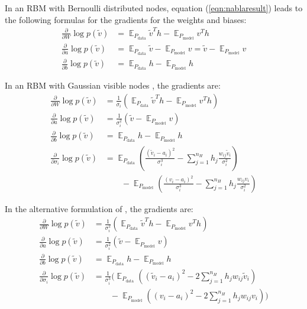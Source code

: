 \documentclass[12pt]{article}
\DeclareMathOperator{\EX}{\mathbb{E}}
\begin{document}
In an RBM with Bernoulli distributed nodes, equation (\ref{eqn:nablaresult}) leads to the following formulas for the gradients for the weights and biases:
\begin{align*}
\frac{\partial}{\partial W}  \log p(\widetilde{v}) &= \EX_{P_\text{data}}  \widetilde{v}^T h - \EX_{P_\text{model}} v^T h \\
\frac{\partial}{\partial a}  \log p(\widetilde{v}) &=  \EX_{P_\text{data}}
\widetilde{v} - \EX_{P_\text{model}}  v = \widetilde{v} - \EX_{P_\text{model}} v\\
\frac{\partial}{\partial b}  \log p(\widetilde{v}) &=  \EX_{P_\text{data}} h - \EX_{P_\text{model}} h
\end{align*}

In an RBM with Gaussian visible nodes \citep{krizhevsky2009tinyimagesthesis}, the  gradients are:
\begin{align*}
\frac{\partial}{\partial W} \log p(\widetilde{v}) &= \frac{1}{\sigma_i} \left ( \EX_{P_\text{data}} \widetilde{v}^T h - \EX_{P_\text{model}} v^T h \right) \\
\frac{\partial}{\partial a} \log p(\widetilde{v}) &= \frac{1}{\sigma_i^2} \left(\widetilde{v} - \EX_{P_\text{model}} v \right)\\
\frac{\partial}{\partial b} \log p(\widetilde{v}) &= \EX_{P_\text{data}} h - \EX_{P_\text{model}} h \\
\frac{\partial}{\partial \sigma_{i}} \log p(\widetilde{v}) &= \EX_{P_\text{data}} \left( \frac{(\widetilde{v}_i - a_i)^2}{\sigma_i^3} - \sum_{j=1}^{n_H} h_j \frac{w_{ij} \widetilde{v}_i}{\sigma_i^2}\right) \\ & \quad \quad - \EX_{P_\text{model}} \left(\frac{(v_i - a_i)^2}{\sigma_i^3} -\sum_{j=1}^{n_H} h_j \frac{w_{ij} v_i}{\sigma_i^2} \right)
\end{align*}

In the alternative formulation of \cite{cho2011improved}, the gradients are:
\begin{align*}
\frac{\partial}{\partial W} \log p(\widetilde{v}) &= \frac{1}{\sigma_i^2} \left ( \EX_{P_\text{data}} \widetilde{v}^T h - \EX_{P_\text{model}} v^T h \right) \\
\frac{\partial}{\partial a} \log p(\widetilde{v}) &= \frac{1}{\sigma_i^2} \left(\widetilde{v} - \EX_{P_\text{model}} v \right)\\
\frac{\partial}{\partial b} \log p(\widetilde{v}) &= \EX_{P_\text{data}} h - \EX_{P_\text{model}} h \\
\frac{\partial}{\partial \sigma_{i}} \log p(\widetilde{v}) &=  \frac{1}{\sigma_i^3} \Bigg( \EX_{P_\text{data}} \left( (\widetilde{v}_i - a_i)^2 - 2\sum_{j=1}^{n_H} h_j w_{ij} \widetilde{v}_i  \right) \\ & \quad \quad - \EX_{P_\text{model}} \left((v_i - a_i)^2 -2\sum_{j=1}^{n_H} h_j w_{ij} v_i \right) \Bigg)
\end{align*}
\end{document}
